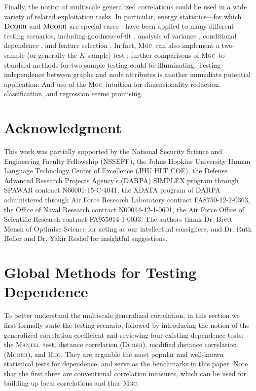 \documentclass[11pt]{article}
\providecommand{\sct}[1]{{\normalfont\textsc{#1}}}
\newcommand{\Mgc}{\sct{Mgc}}
\newcommand{\Hhg}{\sct{Hhg}}
\newcommand{\Dcorr}{\sct{Dcorr}}
\newcommand{\Mcorr}{\sct{Mcorr}}
\newcommand{\Mantel}{\sct{Mantel}}
\begin{document}
Finally, the notion of multiscale generalized correlations could be used in a wide variety of related exploitation tasks.  In particular, energy statistics---for which $\Dcorr$ and $\Mcorr$ are special cases---have been applied to many different testing scenarios, including goodness-of-fit  \cite{Szekely2005}, analysis of variance  \cite{Rizzo2010}, conditional dependence  \cite{Szekely2014,Wang2015},   and feature selection \cite{LiZhongZhu2012,Zhong2015}.     
In fact, \Mgc~can also implement a two-sample (or generally the $K$-sample) test \cite{Szekely2004, heller2016consistent}; further comparisons of \Mgc~to standard methods for two-sample testing could be illuminating.
Testing independence between graphs and node attributes \cite{Fosdick2015} is another immediate potential application.  And use of the \Mgc~intuition for dimensionality reduction, classification, and regression seems promising.



\clearpage
\pagestyle{empty}




\section*{Acknowledgment}
This work was partially supported by the
%
National Security Science and Engineering Faculty Fellowship (NSSEFF),
%
the Johns Hopkins University Human Language Technology Center of Excellence (JHU HLT COE),  the
%
Defense Advanced Research Projects Agency's (DARPA) SIMPLEX program through SPAWAR contract N66001-15-C-4041,
%
the XDATA program of DARPA administered through Air Force Research Laboratory contract FA8750-12-2-0303,
%
the Office of Naval Research contract N00014-12-1-0601,
%
the Air Force Office of Scientific Research contract FA955014-1-0033. The authors thank Dr. Brett Mensh of Optimize Science for acting as our intellectual consigliere, and Dr. Ruth Heller and Dr. Yakir Reshef for insightful suggestions.


\clearpage
\appendix
\setcounter{figure}{0}
\renewcommand{\thealgorithm}{C\arabic{algorithm}}
\renewcommand{\thefigure}{E\arabic{figure}}
\renewcommand{\thesubsection}{\thesection.\Roman{subsection}}

\section{Global Methods for Testing Dependence}
\label{appen:global}
To better understand the multiscale generalized correlation, in this section we first formally state the testing scenario, followed by introducing the notion of the generalized correlation coefficient and reviewing four existing dependence tests: the \Mantel~test, distance correlation (\Dcorr), modified distance correlation (\Mcorr), and \Hhg. They are arguable the most popular and well-known statistical tests for dependence, and serve as the benchmarks in this paper. Note that the first three are conventional correlation measures, which can be used for building up local correlations and thus  \Mgc.
\end{document}
